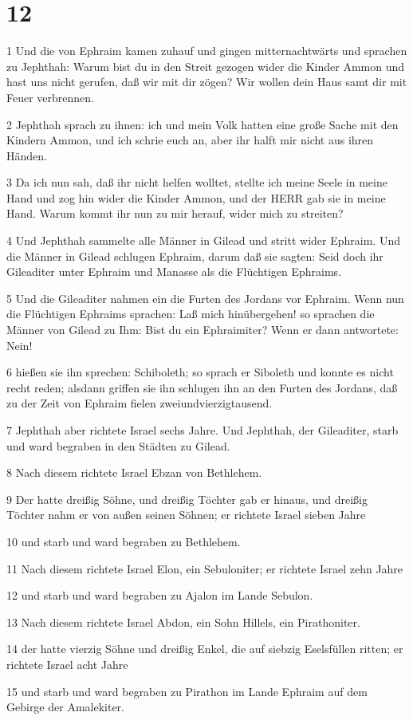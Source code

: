 \chapter{12}

\par 1 Und die von Ephraim kamen zuhauf und gingen mitternachtwärts und sprachen zu Jephthah: Warum bist du in den Streit gezogen wider die Kinder Ammon und hast uns nicht gerufen, daß wir mit dir zögen? Wir wollen dein Haus samt dir mit Feuer verbrennen.
\par 2 Jephthah sprach zu ihnen: ich und mein Volk hatten eine große Sache mit den Kindern Ammon, und ich schrie euch an, aber ihr halft mir nicht aus ihren Händen.
\par 3 Da ich nun sah, daß ihr nicht helfen wolltet, stellte ich meine Seele in meine Hand und zog hin wider die Kinder Ammon, und der HERR gab sie in meine Hand. Warum kommt ihr nun zu mir herauf, wider mich zu streiten?
\par 4 Und Jephthah sammelte alle Männer in Gilead und stritt wider Ephraim. Und die Männer in Gilead schlugen Ephraim, darum daß sie sagten: Seid doch ihr Gileaditer unter Ephraim und Manasse als die Flüchtigen Ephraims.
\par 5 Und die Gileaditer nahmen ein die Furten des Jordans vor Ephraim. Wenn nun die Flüchtigen Ephraims sprachen: Laß mich hinübergehen! so sprachen die Männer von Gilead zu Ihm: Bist du ein Ephraimiter? Wenn er dann antwortete: Nein!
\par 6 hießen sie ihn sprechen: Schiboleth; so sprach er Siboleth und konnte es nicht recht reden; alsdann griffen sie ihn schlugen ihn an den Furten des Jordans, daß zu der Zeit von Ephraim fielen zweiundvierzigtausend.
\par 7 Jephthah aber richtete Israel sechs Jahre. Und Jephthah, der Gileaditer, starb und ward begraben in den Städten zu Gilead.
\par 8 Nach diesem richtete Israel Ebzan von Bethlehem.
\par 9 Der hatte dreißig Söhne, und dreißig Töchter gab er hinaus, und dreißig Töchter nahm er von außen seinen Söhnen; er richtete Israel sieben Jahre
\par 10 und starb und ward begraben zu Bethlehem.
\par 11 Nach diesem richtete Israel Elon, ein Sebuloniter; er richtete Israel zehn Jahre
\par 12 und starb und ward begraben zu Ajalon im Lande Sebulon.
\par 13 Nach diesem richtete Israel Abdon, ein Sohn Hillels, ein Pirathoniter.
\par 14 der hatte vierzig Söhne und dreißig Enkel, die auf siebzig Eselsfüllen ritten; er richtete Israel acht Jahre
\par 15 und starb und ward begraben zu Pirathon im Lande Ephraim auf dem Gebirge der Amalekiter.

